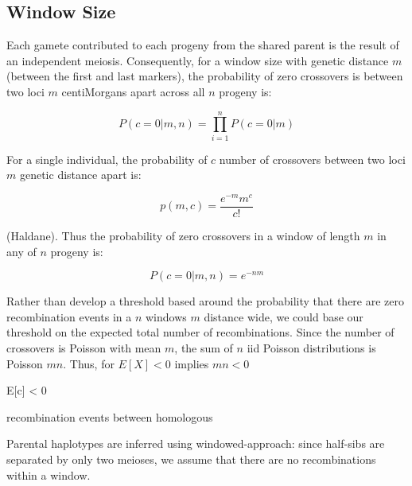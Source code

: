 \documentclass[11pt]{article}
\begin{document}
\subsection{Window Size}

Each gamete contributed to each progeny from the shared parent is the
result of an independent meiosis. Consequently, for a window size with genetic
distance $m$ (between the first and last markers), the probability of zero
crossovers is between two loci $m$ centiMorgans apart across all $n$ progeny
is:

$$
P(c = 0 | m, n) = \prod_{i=1}^n P(c = 0 | m)
$$

For a single individual, the probability of $c$ number of crossovers between
two loci $m$ genetic distance apart is:

$$
p(m, c) = \frac{e^{-m}m^c}{c!}
$$

(Haldane). Thus the probability of zero crossovers in a window of length $m$ in
any of $n$ progeny is:

$$
P(c = 0 | m, n) = e^{-nm}
$$

Rather than develop a threshold based around the probability that there are
zero recombination events in a $n$ windows $m$ distance wide, we could base our
threshold on the expected total number of recombinations. Since the number of
crossovers is Poisson with mean $m$, the sum of $n$ iid Poisson distributions
is Poisson $mn$. Thus, for $E[X] < 0$ implies $mn < 0$

E[c] < 0


recombination events
between homologous 



Parental haplotypes are inferred using windowed-approach: since half-sibs are
separated by only two meioses, we assume that there are no recombinations
within a window. 




\end{document}
